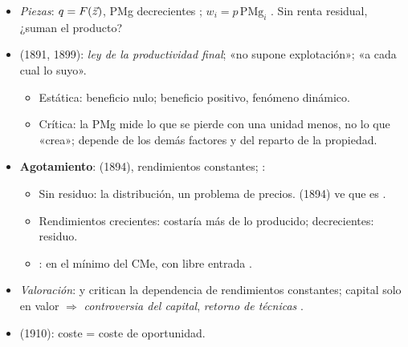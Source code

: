 \documentclass{article}
\begin{document}
\begin{columnas}
\begin{itemize}
\item \emph{Piezas}: $q=F(\vec{z})$, PMg decrecientes ; $w_i=p\,\mathrm{PMg}_i$ . Sin renta residual, ¿suman el producto?
\item {} (1891, 1899): \emph{ley de la productividad final}; «no supone explotación»; «a cada cual lo suyo».
  \begin{itemize}
  \item Estática: beneficio nulo; beneficio positivo, fenómeno dinámico.
  \item Crítica: la PMg mide lo que se pierde con una unidad menos, no lo que «crea»; depende de los demás factores y del reparto de la propiedad.
  \end{itemize}
\item \textbf{Agotamiento}:  (1894), rendimientos constantes; :
  \begin{itemize}
  \item Sin residuo: la distribución, un problema de precios.  (1894) ve que es .
  \item Rendimientos crecientes: costaría más de lo producido; decrecientes: residuo.
  \item {}: en el mínimo del CMe, con libre entrada .
  \end{itemize}
\item \emph{Valoración}:  y  critican la dependencia de rendimientos constantes; capital solo en valor $\Rightarrow$ \emph{controversia del capital}, \emph{retorno de técnicas} .
\item {} (1910): coste = coste de oportunidad.
\end{itemize}


\end{columnas}
\end{document}
